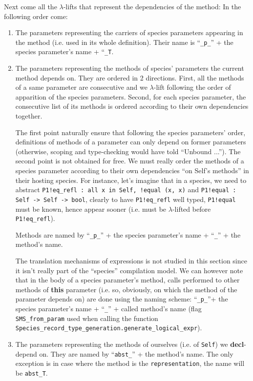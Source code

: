 \medskip
Next come all the $\lambda$-lifts that represent the dependencies of
the method: In the following order come:
\begin{enumerate}
\item The parameters representing the carriers of species parameters
  appearing in the method (i.e. used in its whole definition). Their
  name is ``{\tt \_p\_}'' + the species parameter's name +
  ``{\tt \_T}. 
\item The parameters representing the methods of species' parameters
  the current method depends on. They are ordered in 2
  directions. First, all the methods of a same parameter are
  consecutive and we $\lambda$-lift following the order of apparition of
  the species parameters. Second, for each species parameter, the
  consecutive list of its methods is ordered according to their own
  dependencies together.

  The first point naturally ensure that following the species
  parameters' order, definitions of methods of a parameter can only
  depend on former parameters (otherwise, scoping and type-checking
  would have told ``Unbound ...''). The second point is not obtained
  for free. We must really order the methods of a species parameter
  according to their own dependencies ``on Self's methods'' in their
  hosting species. For instance, let's imagine that in a species, we
  need to abstract
  {\tt P1!eq\_refl : all x in Self, !equal (x, x)} and
  {\tt P1!equal : Self -> Self -> bool}, clearly to have
  {\tt P1!eq\_refl} well typed, {\tt P1!equal} must be known, hence
  appear sooner (i.e. must be $\lambda$-lifted before
  {\tt P1!eq\_refl}).

  Methods are named by ``{\tt \_p\_}'' + the species parameter's name
  + ``{\tt \_}'' + the method's name.

  The translation mechanisms of expressions is not studied in this
  section since it isn't really part of the ``species'' compilation
  model. We can however note that in the body of a species
  parameter's method, calls performed to other methods of {\bf this}
  parameter (i.e. so, obviously, on which the method of the parameter
  depends on) are done using the naming scheme: ``{\tt \_p\_}''+ the
  species parameter's name + ``{\tt \_}'' + called method's name (flag
  {\tt SMS\_from\_param} used when calling the function \\
  {\tt Species\_record\_type\_generation.generate\_logical\_expr}).

\item The 
  parameters representing the methods of ourselves (i.e. of
  {\tt Self}) we {\bf decl}-depend on. They are named by
  ``{\tt abst\_}'' + the method's name. The only exception is in case
  where the method is the {\tt representation}, the name will be
  {\tt abst\_T}.


\end{enumerate}
